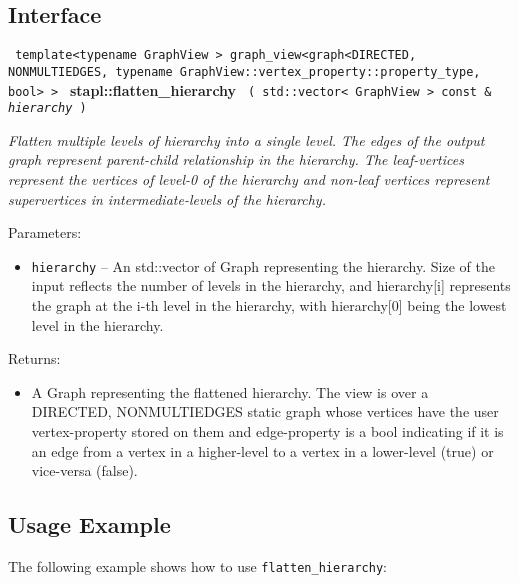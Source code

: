 \subsection{Interface} \label{sec-flat-hier-alg-inter}

\noindent
\texttt{%
template<typename GraphView >
\newline
graph\_view<graph<DIRECTED, NONMULTIEDGES, 
\newline
typename GraphView::vertex\_property::property\_type, bool> > 
}
\newline
\textbf{stapl::flatten\_hierarchy}%
\newline
\texttt{%
(
std::vector< GraphView > const \&
\textit{hierarchy}%
)    
}
\vspace{0.4cm}

\textit{
Flatten multiple levels of hierarchy into a single level.
The edges of the output graph represent parent-child relationship in the hierarchy. 
The leaf-vertices represent the vertices of level-0 of the hierarchy and non-leaf vertices represent supervertices in intermediate-levels of the hierarchy.
}
\vspace{0.4cm}

Parameters:
\begin{itemize}
\item
\texttt{hierarchy} --
An std::vector of Graph representing the hierarchy. Size of the input reflects the number of levels in the hierarchy, and hierarchy[i] represents the graph at the i-th level in the hierarchy, with hierarchy[0] being the lowest level in the hierarchy.
\end{itemize}

Returns:
\begin{itemize}
\item
 A Graph representing the flattened hierarchy. The view is over a DIRECTED, NONMULTIEDGES static graph whose vertices have the user vertex-property stored on them and edge-property is a bool indicating if it is an edge from a vertex in a higher-level to a vertex in a lower-level (true) or vice-versa (false). 
\end{itemize}

\subsection{Usage Example} \label{sec-flat-hier-alg-use}

The following example shows how to use 
\texttt{flatten\_hierarchy}:


